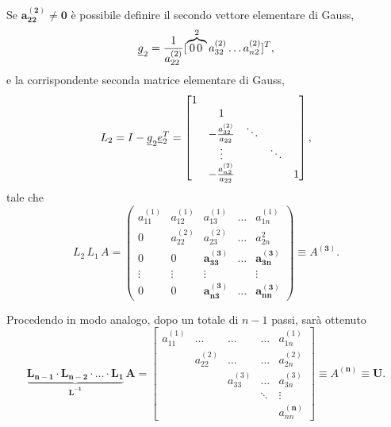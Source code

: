 Se $\boldsymbol{a_{22}^{(2)}\neq 0}$ è possibile definire il secondo vettore elementare di Gauss,
\begin{equation}\label{eq:2oVettElemGauss}
    \uline g_2 = \frac{1}{a_{22}^{(2)}}[\overbrace{0\, 0\,}^{2} a_{32}^{(2)}\hdots a_{n2}^{(2)}]^T,
\end{equation}
e la corrispondente seconda matrice elementare di Gauss,
\begin{equation*}
    L_2=I-\uline g_2\uline e_2^T=\begin{bmatrix}
        1 & & &\\
        & 1 & &\\
        & -\frac{a_{32}^{(2)}}{a_{22}} & \ddots &\\
        & \vdots &&\ddots\\
        & -\frac{a_{n2}^{(2)}}{a_{22}}  & & & 1
    \end{bmatrix},
\end{equation*}
tale che 
\begin{equation*}
    L_2\, L_1\, A = 
    \begin{pmatrix}
        a_{11}^{(1)} & a_{12}^{(1)} & a_{13}^{(1)} & \hdots & a_{1n}^{(1)}\\
        0 & a_{22}^{(2)} & a_{23}^{(2)} & \hdots & a_{2n}^{2}\\
        0 & 0 & \boldsymbol{a_{33}^{(3)}} & \boldsymbol\hdots & \boldsymbol{a_{3n}^{(3)}}\\
        \vdots & \vdots & \vdots & &\vdots\\
        0 & 0 & \boldsymbol{a_{n3}^{(3)}} & \boldsymbol\hdots & \boldsymbol{a_{nn}^{(3)}}
    \end{pmatrix}\equiv A^{\boldsymbol{(3)}}.
\end{equation*}

Procedendo in modo analogo, dopo un totale di $n-1$ passi,  sarà ottenuto
\begin{equation}\label{eq:fattLU}
    \boldsymbol{\underbrace{L_{n-1}\cdot L_{n-2}\cdot\hdots\cdot L_1}_{L^{-1}}\, A}=
    \begin{bmatrix}
        a_{11}^{(1)} &\hdots &\hdots &\hdots & a_{1n}^{(1)} \\
        & a_{22}^{(2)} &\hdots &\hdots & a_{2n}^{(2)}\\
        & & a_{33}^{(3)} &\hdots & a_{3n}^{(3)}\\
        & & &\ddots & \vdots \\
        & & & & a_{nn}^{\boldsymbol{(n)}}
    \end{bmatrix}\equiv A^{\boldsymbol{(n)}}\boldsymbol{\equiv U}.
\end{equation}

